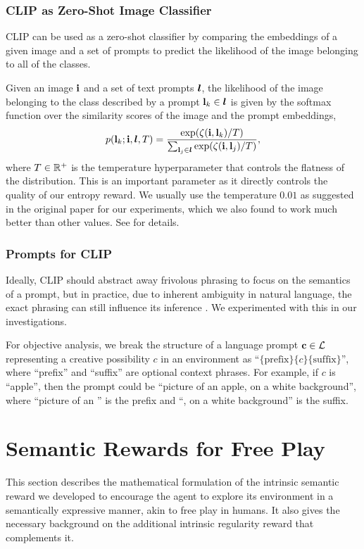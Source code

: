 \subsubsection{CLIP as Zero-Shot Image Classifier}
\label{sec:clip-classifier}
CLIP can be used as a zero-shot classifier by comparing the embeddings of a given image and a set of prompts to predict the likelihood of the image belonging to all of the classes.

Given an image \(\mathbf{i}\) and a set of text prompts \(\bm{l}\), the likelihood of the image belonging to the class described by a prompt \(\mathbf{l}_k \in \bm{l}\) is given by the softmax function over the similarity scores of the image and the prompt embeddings,
\begin{equation}
    \label{eq:clip-dist}
    p(\mathbf{l}_k; \mathbf{i}, \bm{l}, T) = \dfrac{\exp(\zeta(\mathbf{i}, \mathbf{l}_k)/T)}{\sum_{\mathbf{l}_j \in \bm{l}} \exp(\zeta(\mathbf{i}, \mathbf{l}_j)/T)},
\end{equation}
where \(T \in \mathbb{R}^+\) is the temperature hyperparameter that controls the flatness of the distribution.
This is an important parameter as it directly controls the quality of our entropy reward.
We usually use the temperature \(0.01\) as suggested in the original paper for our experiments, which we also found to work much better than other values.
See  for details.

\subsubsection{Prompts for CLIP}
\label{sec:prompt-engineering}
Ideally, CLIP should abstract away frivolous phrasing to focus on the semantics of a prompt, but in practice, due to inherent ambiguity in natural language, the exact phrasing can still influence its inference \citep{waffleclip}. 
We experimented with this in our investigations.

For objective analysis, we break the structure of a language prompt \(\mathbf{c} \in \mathcal{L}\) representing a creative possibility \(c\) in an environment as ``\(\{\text{prefix}\}\{c\}\{\text{suffix}\}\)'', where ``prefix'' and ``suffix'' are optional context phrases. For example, if \(c\) is ``apple'', then the prompt could be ``picture of an apple, on a white background'', where ``picture of an '' is the prefix and ``, on a white background'' is the suffix.

\section{Semantic Rewards for Free Play}
\label{sec:semantics-reward}
This section describes the mathematical formulation of the intrinsic semantic reward we developed to encourage the agent to explore its environment in a semantically expressive manner, akin to free play in humans.
It also gives the necessary background on the additional intrinsic regularity reward that complements it.

